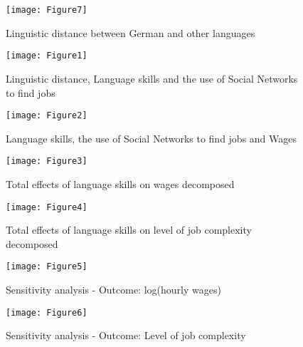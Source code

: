 \documentclass[12pt,a4paper]{article}
\begin{document}
\begin{figure}
\centering     %
\texttt{[image: Figure7]}
\caption{Linguistic distance between German and other languages}
\end{figure}

\begin{figure}
\centering     %
\texttt{[image: Figure1]}
\caption{Linguistic distance, Language skills and the use of Social Networks to find jobs}
\end{figure}

\begin{figure}
\centering     %
\texttt{[image: Figure2]}
\caption{Language skills, the use of Social Networks to find jobs and Wages}
\end{figure}

\begin{figure}
\centering     %
\texttt{[image: Figure3]}
\caption{Total effects of language skills on wages decomposed}
\end{figure}

\begin{figure}
\centering     %
\texttt{[image: Figure4]}
\caption{Total effects of language skills on level of job complexity decomposed}
\end{figure}

\begin{figure}
\centering     %
\texttt{[image: Figure5]}
\caption{Sensitivity analysis - Outcome: log(hourly wages)}
\end{figure}

\begin{figure}
\centering     %
\texttt{[image: Figure6]}
\caption{Sensitivity analysis - Outcome: Level of job complexity}
\end{figure}
\end{document}
